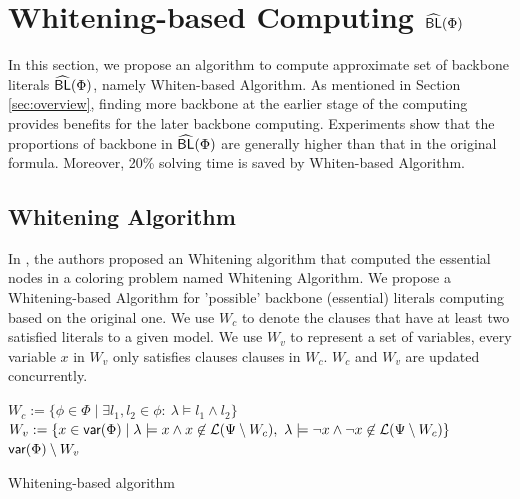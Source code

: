 \section{Whitening-based Computing ${\sf \widehat{BL}}(\Phi)$}

In this section, we propose an algorithm to compute approximate set of backbone literals ${\sf \widehat{BL}}(\Phi)$, namely Whiten-based Algorithm. As mentioned in Section \ref{sec:overview}, finding more backbone at the earlier stage of the computing provides benefits for the later backbone computing. Experiments show that the proportions of backbone in ${\sf \widehat{BL}}(\Phi)$ are generally higher than that in the original formula. Moreover, 20\% solving time is saved by Whiten-based Algorithm.

\subsection{Whitening Algorithm}


In \cite{Par03}, the authors proposed an Whitening algorithm that computed the essential nodes in a coloring problem named Whitening Algorithm. We propose a Whitening-based Algorithm for 'possible' backbone (essential) literals computing based on the original one. We use $W_c$ to denote the clauses that have at least two satisfied literals to a given model. We use $W_v$ to represent a set of variables, every variable $x$ in $W_v$ only satisfies clauses clauses in $W_c$. $W_c$ and $W_v$ are updated concurrently.

\begin{algorithm2e}
\SetAlgoShortEnd
\SetFillComment
{}
$W_c:= \{\phi\in\Phi \mid \exists l_1,l_2\in\phi: \  \lambda\models l_1\wedge l_2\}$\; \label{alg2:c}
$W_v:=\{x\in \var(\Phi)\mid \lambda\models x\wedge x\not\in \Lit(\Psi\setminus W_c),
        \ \lambda\models \neg x\wedge \neg x\not\in \Lit(\Psi\setminus W_c)\}$\; \label{alg2:v}
\Return $\textsf{var}(\Phi)\setminus W_v$\;
\caption{Whitening-based algorithm}
\label{alg:whitening}
\end{algorithm2e}

